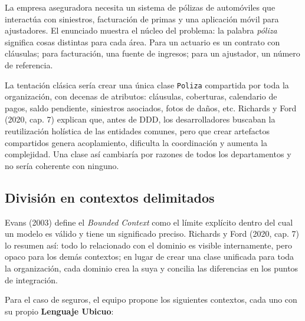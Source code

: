 \documentclass[11pt,a4paper]{article}
\begin{document}
La empresa aseguradora necesita un sistema de pólizas de automóviles que interactúa con siniestros, facturación de primas y una aplicación móvil para ajustadores. El enunciado muestra el núcleo del problema: la palabra \emph{póliza} significa cosas distintas para cada área. Para un actuario es un contrato con cláusulas; para facturación, una fuente de ingresos; para un ajustador, un número de referencia.

La tentación clásica sería crear una única clase \texttt{Poliza} compartida por toda la organización, con decenas de atributos: cláusulas, coberturas, calendario de pagos, saldo pendiente, siniestros asociados, fotos de daños, etc. Richards y Ford (2020, cap. 7) explican que, antes de DDD, los desarrolladores buscaban la reutilización holística de las entidades comunes, pero que crear artefactos compartidos genera acoplamiento, dificulta la coordinación y aumenta la complejidad. Una clase así cambiaría por razones de todos los departamentos y no sería coherente con ninguno.

\subsection{División en contextos delimitados}

Evans (2003) define el \emph{Bounded Context} como el límite explícito dentro del cual un modelo es válido y tiene un significado preciso. Richards y Ford (2020, cap. 7) lo resumen así: todo lo relacionado con el dominio es visible internamente, pero opaco para los demás contextos; en lugar de crear una clase unificada para toda la organización, cada dominio crea la suya y concilia las diferencias en los puntos de integración.

Para el caso de seguros, el equipo propone los siguientes contextos, cada uno con su propio \textbf{Lenguaje Ubicuo}:
\end{document}

